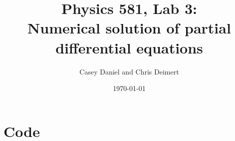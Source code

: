 \documentclass[twocolumn]{myarticle}
\begin{document}
\title{Physics 581, Lab 3:\\Numerical solution of partial differential equations}
\author{Casey Daniel and Chris Deimert}
\date{\today}

\maketitle



\onecolumn

\section{Code}
\label{sec:code}

%
%
\end{document}

